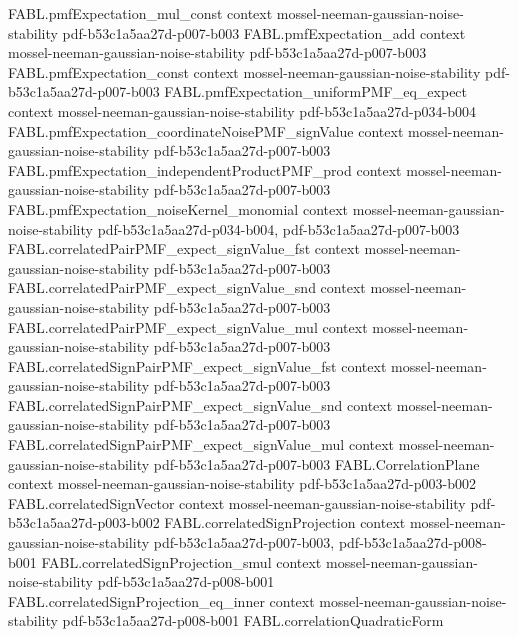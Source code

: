 \begin{theorem}
\proofstep
  {FABL.pmfExpectation_mul_const}
  {context}
  {mossel-neeman-gaussian-noise-stability}
  {pdf-b53c1a5aa27d-p007-b003}
\proofstep
  {FABL.pmfExpectation_add}
  {context}
  {mossel-neeman-gaussian-noise-stability}
  {pdf-b53c1a5aa27d-p007-b003}
\proofstep
  {FABL.pmfExpectation_const}
  {context}
  {mossel-neeman-gaussian-noise-stability}
  {pdf-b53c1a5aa27d-p007-b003}
\proofstep
  {FABL.pmfExpectation_uniformPMF_eq_expect}
  {context}
  {mossel-neeman-gaussian-noise-stability}
  {pdf-b53c1a5aa27d-p034-b004}
\proofstep
  {FABL.pmfExpectation_coordinateNoisePMF_signValue}
  {context}
  {mossel-neeman-gaussian-noise-stability}
  {pdf-b53c1a5aa27d-p007-b003}
\proofstep
  {FABL.pmfExpectation_independentProductPMF_prod}
  {context}
  {mossel-neeman-gaussian-noise-stability}
  {pdf-b53c1a5aa27d-p007-b003}
\proofstep
  {FABL.pmfExpectation_noiseKernel_monomial}
  {context}
  {mossel-neeman-gaussian-noise-stability}
  {pdf-b53c1a5aa27d-p034-b004,
    pdf-b53c1a5aa27d-p007-b003}
\proofstep
  {FABL.correlatedPairPMF_expect_signValue_fst}
  {context}
  {mossel-neeman-gaussian-noise-stability}
  {pdf-b53c1a5aa27d-p007-b003}
\proofstep
  {FABL.correlatedPairPMF_expect_signValue_snd}
  {context}
  {mossel-neeman-gaussian-noise-stability}
  {pdf-b53c1a5aa27d-p007-b003}
\proofstep
  {FABL.correlatedPairPMF_expect_signValue_mul}
  {context}
  {mossel-neeman-gaussian-noise-stability}
  {pdf-b53c1a5aa27d-p007-b003}
\proofstep
  {FABL.correlatedSignPairPMF_expect_signValue_fst}
  {context}
  {mossel-neeman-gaussian-noise-stability}
  {pdf-b53c1a5aa27d-p007-b003}
\proofstep
  {FABL.correlatedSignPairPMF_expect_signValue_snd}
  {context}
  {mossel-neeman-gaussian-noise-stability}
  {pdf-b53c1a5aa27d-p007-b003}
\proofstep
  {FABL.correlatedSignPairPMF_expect_signValue_mul}
  {context}
  {mossel-neeman-gaussian-noise-stability}
  {pdf-b53c1a5aa27d-p007-b003}
\proofstep
  {FABL.CorrelationPlane}
  {context}
  {mossel-neeman-gaussian-noise-stability}
  {pdf-b53c1a5aa27d-p003-b002}
\proofstep
  {FABL.correlatedSignVector}
  {context}
  {mossel-neeman-gaussian-noise-stability}
  {pdf-b53c1a5aa27d-p003-b002}
\proofstep
  {FABL.correlatedSignProjection}
  {context}
  {mossel-neeman-gaussian-noise-stability}
  {pdf-b53c1a5aa27d-p007-b003,
    pdf-b53c1a5aa27d-p008-b001}
\proofstep
  {FABL.correlatedSignProjection_smul}
  {context}
  {mossel-neeman-gaussian-noise-stability}
  {pdf-b53c1a5aa27d-p008-b001}
\proofstep
  {FABL.correlatedSignProjection_eq_inner}
  {context}
  {mossel-neeman-gaussian-noise-stability}
  {pdf-b53c1a5aa27d-p008-b001}
\proofstep
  {FABL.correlationQuadraticForm}

\end{theorem}
